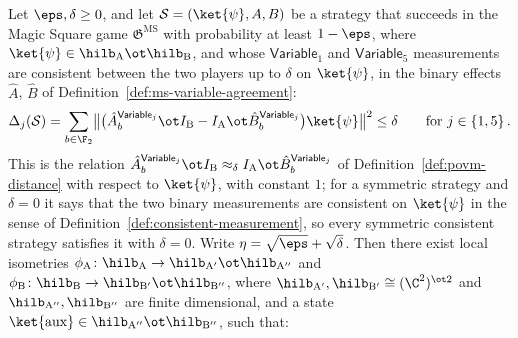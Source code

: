 \begin{theorem}\label{thm:ms-rigidity}
	\leanok
	Let $\eps, \delta \ge 0$, and let $\mathcal S = (\ket{\psi}, A, B)$ be a strategy that succeeds in the Magic Square game $\mathfrak{G}^{\mathrm{MS}}$ with probability at least $1-\eps$, where $\ket{\psi} \in \hilb_{\mathrm A} \ot \hilb_{\mathrm B}$, and whose $\mathsf{Variable}_1$ and $\mathsf{Variable}_5$ measurements are consistent between the two players up to $\delta$ on $\ket{\psi}$, in the binary effects $\hat A$, $\hat B$ of Definition~\ref{def:ms-variable-agreement}:
	\begin{equation}\label{eq:ms-rigidity-consistency}
		\Delta_j(\mathcal S) = \sum_{b \in \F_2} \bigl\| \bigl( \hat A^{\mathsf{Variable}_j}_b \ot I_{\mathrm B} - I_{\mathrm A} \ot \hat B^{\mathsf{Variable}_j}_b \bigr) \ket{\psi} \bigr\|^2 \le \delta \qquad \text{for } j \in \{1, 5\}\,.
	\end{equation}
	This is the relation $\hat A^{\mathsf{Variable}_j}_b \ot I_{\mathrm B} \approx_\delta I_{\mathrm A} \ot \hat B^{\mathsf{Variable}_j}_b$ of Definition~\ref{def:povm-distance} with respect to $\ket{\psi}$, with constant $1$; for a symmetric strategy and $\delta = 0$ it says that the two binary measurements are consistent on $\ket{\psi}$ in the sense of Definition~\ref{def:consistent-measurement}, so every symmetric consistent strategy satisfies it with $\delta = 0$. Write $\eta = \sqrt\eps + \sqrt\delta$. Then there exist local isometries $\phi_{\mathrm A}\colon \hilb_{\mathrm A} \to \hilb_{\mathrm A'} \ot \hilb_{\mathrm A''}$ and $\phi_{\mathrm B}\colon \hilb_{\mathrm B} \to \hilb_{\mathrm B'} \ot \hilb_{\mathrm B''}$, where $\hilb_{\mathrm A'}, \hilb_{\mathrm B'} \cong (\C^2)^{\ot 2}$ and $\hilb_{\mathrm A''}, \hilb_{\mathrm B''}$ are finite dimensional, and a state $\ket{\mathrm{aux}} \in \hilb_{\mathrm A''} \ot \hilb_{\mathrm B''}$, such that:

\end{theorem}
